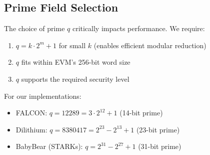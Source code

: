 \subsection{Prime Field Selection}

The choice of prime $q$ critically impacts performance. We require:
\begin{enumerate}
\item $q = k \cdot 2^m + 1$ for small $k$ (enables efficient modular reduction)
\item $q$ fits within EVM's 256-bit word size
\item $q$ supports the required security level
\end{enumerate}

For our implementations:
\begin{itemize}
\item FALCON: $q = 12289 = 3 \cdot 2^{12} + 1$ (14-bit prime)
\item Dilithium: $q = 8380417 = 2^{23} - 2^{13} + 1$ (23-bit prime)
\item BabyBear (STARKs): $q = 2^{31} - 2^{27} + 1$ (31-bit prime)
\end{itemize}

